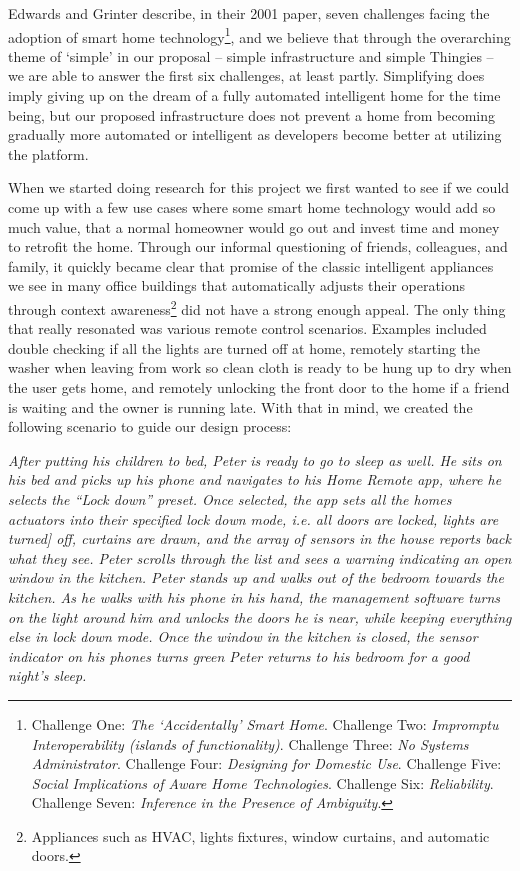 \documentclass{ubicomp2012}
\begin{document}
Edwards and Grinter describe, in their 2001 paper\cite{Edwards01athome}, seven challenges facing the adoption of smart home technology\footnote{Challenge One: \textit{The `Accidentally' Smart Home}. Challenge Two: \textit{Impromptu Interoperability (islands of functionality)}. Challenge Three: \textit{No Systems Administrator}. Challenge Four: \textit{Designing for Domestic Use}. Challenge Five: \textit{Social Implications of Aware Home Technologies}. Challenge Six: \textit{Reliability}. Challenge Seven: \textit{Inference in the Presence of Ambiguity}.}, and we believe that through the overarching theme of `simple' in our proposal -- simple infrastructure and simple Thingies -- we are able to answer the first six challenges, at least partly. Simplifying does imply giving up on the dream of a fully automated intelligent home for the time being, but our proposed infrastructure does not prevent a home from becoming gradually more automated or intelligent as developers become better at utilizing the platform.

When we started doing research for this project we first wanted to see if we could come up with a few use cases where some smart home technology would add so much value, that a normal homeowner would go out and invest time and money to retrofit the home. Through our informal questioning of friends, colleagues, and family, it quickly became clear that promise of the classic intelligent appliances we see in many office buildings that automatically adjusts their operations through context awareness\footnote{Appliances such as HVAC, lights fixtures, window curtains, and automatic doors.} did not have a strong enough appeal. The only thing that really resonated was various remote control scenarios. Examples included double checking if all the lights are turned off at home, remotely starting the washer when leaving from work so clean cloth is ready to be hung up to dry when the user gets home, and remotely unlocking the front door to the home if a friend is waiting and the owner is running late. With that in mind,  we created the following scenario to guide our design process:

\textit{After putting his children to bed, Peter is ready to go to sleep as well. He sits on his bed and picks up his phone and navigates to his Home Remote app, where he selects the ``Lock down'' preset. Once selected, the app sets all the homes  actuators into their specified lock down mode, i.e. all doors are locked, lights are turned] off, curtains are drawn, and the array of sensors in the house reports back what they see. Peter scrolls through the list and sees a warning indicating an open window in the kitchen. Peter stands up and walks out of the bedroom towards the kitchen. As he walks with his phone in his hand, the management software turns on the light around him and unlocks the doors he is near, while keeping everything else in lock down mode. Once the window in the kitchen is closed, the sensor indicator on his phones turns green Peter returns to his bedroom for a good night’s sleep.}
\end{document}

